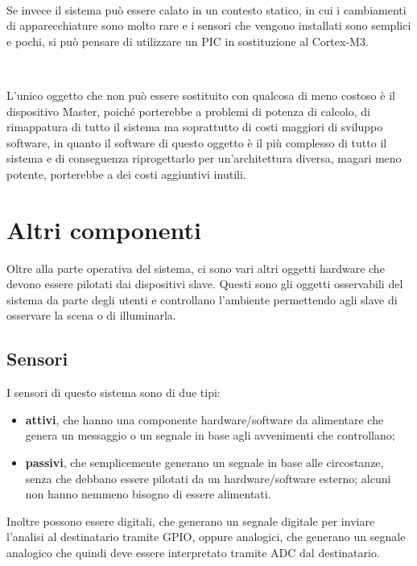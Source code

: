 \documentclass[a4paper,titlepage]{book}
\newcommand{\itema}{\begin{itemize}[noitemsep,topsep=10pt,parsep=5pt,partopsep=10pt]}
\begin{document}
~

Se invece il sistema può essere calato in un contesto statico, in cui i cambiamenti di apparecchiature sono molto rare e i sensori che vengono installati sono semplici e pochi, si può pensare di utilizzare un PIC in sostituzione al Cortex-M3.

~

L'unico oggetto che non può essere sostituito con qualcosa di meno costoso è il dispositivo Master, poiché porterebbe a problemi di potenza di calcolo, di rimappatura di tutto il sistema ma soprattutto di costi maggiori di sviluppo software, in quanto il software di questo oggetto è il più complesso di tutto il sistema e di conseguenza riprogettarlo per un'architettura diversa, magari meno potente, porterebbe a dei costi aggiuntivi inutili. 



\section{Altri componenti}

Oltre alla parte operativa del sistema, ci sono vari altri oggetti hardware che devono essere pilotati dai dispositivi slave. Questi sono gli oggetti osservabili del sistema da parte degli utenti e controllano l'ambiente permettendo agli slave di osservare la scena o di illuminarla.

\subsection{Sensori}

I sensori di questo sistema sono di due tipi:

\itema

\item \textbf{attivi}, che hanno una componente hardware/software da alimentare che genera un messaggio o un segnale in base agli avvenimenti che controllano;

\item \textbf{passivi}, che semplicemente generano un segnale in base alle circostanze, senza che debbano essere pilotati da un hardware/software esterno; alcuni non hanno nemmeno bisogno di essere alimentati.

\end{itemize}  

Inoltre possono essere digitali, che generano un segnale digitale per inviare l'analisi al destinatario tramite GPIO, oppure analogici, che generano un segnale analogico che quindi deve essere interpretato tramite ADC dal destinatario.
\end{document}
